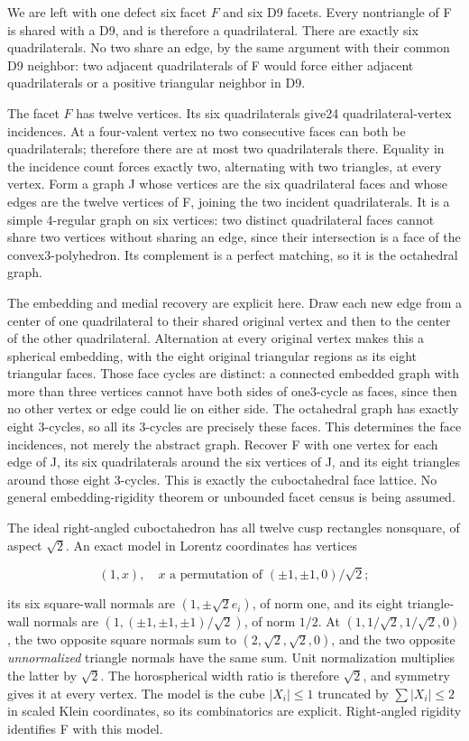 \documentclass[11pt]{article}
\begin{document}
We are left with one defect six facet \(F\) and six D9 facets. Every nontriangle of F is shared with a D9, and is therefore a quadrilateral. There are exactly six quadrilaterals. No two share an edge, by the same argument with their common D9 neighbor: two adjacent quadrilaterals of F would force either adjacent quadrilaterals or a positive triangular neighbor in D9.

The facet \(F\) has twelve vertices. Its six quadrilaterals give24 quadrilateral-vertex incidences. At a four-valent vertex no two consecutive faces can both be quadrilaterals; therefore there are at most two quadrilaterals there. Equality in the incidence count forces exactly two, alternating with two triangles, at every vertex. Form a graph J whose vertices are the six quadrilateral faces and whose edges are the twelve vertices of F, joining the two incident quadrilaterals. It is a simple 4-regular graph on six vertices: two distinct quadrilateral faces cannot share two vertices without sharing an edge, since their intersection is a face of the convex3-polyhedron. Its complement is a perfect matching, so it is the octahedral graph.

The embedding and medial recovery are explicit here. Draw each new edge from a center of one quadrilateral to their shared original vertex and then to the center of the other quadrilateral. Alternation at every original vertex makes this a spherical embedding, with the eight original triangular regions as its eight triangular faces. Those face cycles are distinct: a connected embedded graph with more than three vertices cannot have both sides of one3-cycle as faces, since then no other vertex or edge could lie on either side. The octahedral graph has exactly eight 3-cycles, so all its 3-cycles are precisely these faces. This determines the face incidences, not merely the abstract graph. Recover F with one vertex for each edge of J, its six quadrilaterals around the six vertices of J, and its eight triangles around those eight 3-cycles. This is exactly the cuboctahedral face lattice. No general embedding-rigidity theorem or unbounded facet census is being assumed.

The ideal right-angled cuboctahedron has all twelve cusp rectangles nonsquare, of aspect \(\sqrt2\). An exact model in Lorentz coordinates has vertices

\[
 (1,x),\quad x\text{ a permutation of }(\pm1,\pm1,0)/\sqrt2;
\]

its six square-wall normals are \((1,\pm\sqrt2 e_i)\), of norm one, and its eight triangle-wall normals are \((1,(\pm1,\pm1,\pm1)/\sqrt2)\), of norm \(1/2\). At \((1,1/\sqrt2,1/\sqrt2,0)\), the two opposite square normals sum to \((2,\sqrt2,\sqrt2,0)\), and the two opposite \emph{unnormalized} triangle normals have the same sum. Unit normalization multiplies the latter by \(\sqrt2\). The horospherical width ratio is therefore \(\sqrt2\), and symmetry gives it at every vertex. The model is the cube \(|X_i|\le1\) truncated by \(\sum|X_i|\le2\) in scaled Klein coordinates, so its combinatorics are explicit. Right-angled rigidity identifies F with this model.
\end{document}
